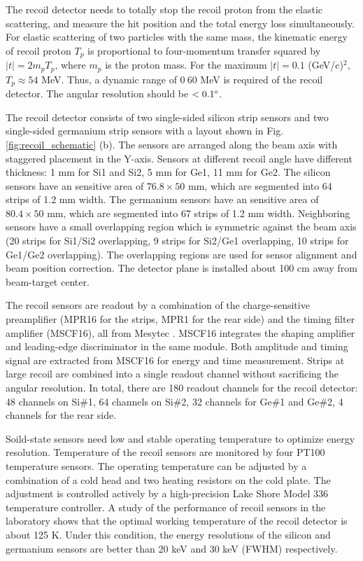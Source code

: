 \documentclass[number,5p]{elsarticle}
\begin{document}
The recoil detector needs to totally stop the recoil proton from the
elastic scattering, and measure the hit position and the total energy loss simultaneously.
For elastic scattering of two particles with the same mass,
the kinematic energy of recoil proton \(T_p\) is proportional to four-momentum
transfer squared by \(|t| = 2m_pT_p\), where \(m_p\) is the proton mass.
For the maximum \(|t|=0.1\) (GeV/c)$^2$, \(T_p \approx 54\) MeV. Thus, a dynamic range of
$0~60$ MeV is required of the recoil detector. The angular resolution should be
$< 0.1\degree$.

The recoil detector consists of two single-sided silicon strip sensors and two single-sided germanium strip sensors with a layout shown in Fig. \ref{fig:recoil_schematic} (b).
The sensors are arranged along the beam axis with staggered placement in the Y-axis.
Sensors at different recoil angle have different thickness: 1 mm for Si1 and Si2, 5 mm for Ge1, 11 mm for Ge2.
The silicon sensors have an sensitive area of \(76.8 \times 50\) mm, which are segmented into 64 strips of 1.2 mm width.
The germanium sensors have an sensitive area of \(80.4 \times 50\) mm, which are segmented into 67 strips of 1.2 mm width.
Neighboring sensors have a small overlapping region which is symmetric against
the beam axis (20 strips for Si1/Si2 overlapping, 9 strips for Si2/Ge1 overlapping, 10 strips for Ge1/Ge2 overlapping).
The overlapping regions are used for sensor alignment and beam position correction.
The detector plane is installed about 100 cm away from beam-target center.

The recoil sensors are readout by a combination of the charge-sensitive preamplifier (MPR16 for the strips, MPR1 for the rear side) 
and the timing filter amplifier (MSCF16), all from Mesytec \cite{mesytec}. 
MSCF16 integrates the shaping amplifier and leading-edge discriminator in the same module.
Both amplitude and timing signal are extracted from MSCF16 for energy and time measurement.
Strips at large recoil are combined into a single readout channel without sacrificing the angular resolution.
In total, there are 180 readout channels for the recoil detector: 
48 channels on Si\#1, 64 channels on Si\#2, 32 channels for Ge\#1 and Ge\#2, 4 channels for the rear side. 

Soild-state sensors need low and stable operating temperature to optimize energy
resolution.
Temperature of the recoil sensors are monitored by four PT100 temperature sensors.
The operating temperature can be adjusted by a combination of a cold head and two heating resistors on the cold plate.
The adjustment is controlled actively by a high-precision Lake Shore Model 336 temperature controller.
A study of the performance of recoil sensors in the laboratory shows that the
optimal working temperature of the recoil detector is about 125 K.
Under this condition, the energy resolutions of the silicon and germanium sensors are better than 20 keV and 30 keV (FWHM) respectively.
\end{document}
